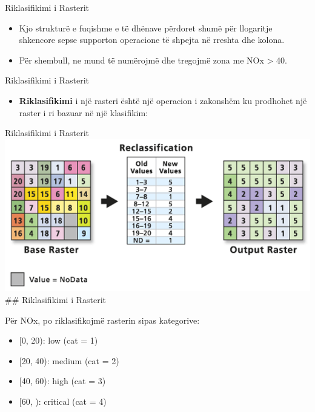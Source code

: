 \documentclass[
  ignorenonframetext,
]{beamer}
\providecommand{\tightlist}{%
  \setlength{\itemsep}{0pt}\setlength{\parskip}{0pt}}
\begin{document}
\begin{frame}{Riklasifikimi i Rasterit}
\protect\hypertarget{riklasifikimi-i-rasterit-2}{}
\begin{itemize}
\item
  Kjo strukturë e fuqishme e të dhënave përdoret shumë për llogaritje
  shkencore sepse supporton operacione të shpejta në rreshta dhe kolona.
\item
  Për shembull, ne mund të numërojmë dhe tregojmë zona me NOx
  \textgreater{} 40.
\end{itemize}
\end{frame}

\begin{frame}{Riklasifikimi i Rasterit}
\protect\hypertarget{riklasifikimi-i-rasterit-3}{}
\begin{itemize}
\tightlist
\item
  \textbf{Riklasifikimi} i një rasteri është një operacion i zakonshëm
  ku prodhohet një raster i ri bazuar në një klasifikim:
\end{itemize}
\end{frame}

\begin{frame}{Riklasifikimi i Rasterit}
\protect\hypertarget{riklasifikimi-i-rasterit-4}{}
\includegraphics{./Figs/reclassify1.png} \#\# Riklasifikimi i Rasterit

Për NOx, po riklasifikojmë rasterin sipas kategorive:

\begin{itemize}
\item
  {[}0, 20): low (cat = 1)
\item
  {[}20, 40): medium (cat = 2)
\item
  {[}40, 60): high (cat = 3)
\item
  {[}60, ): critical (cat = 4)
\end{itemize}
\end{frame}
\end{document}
